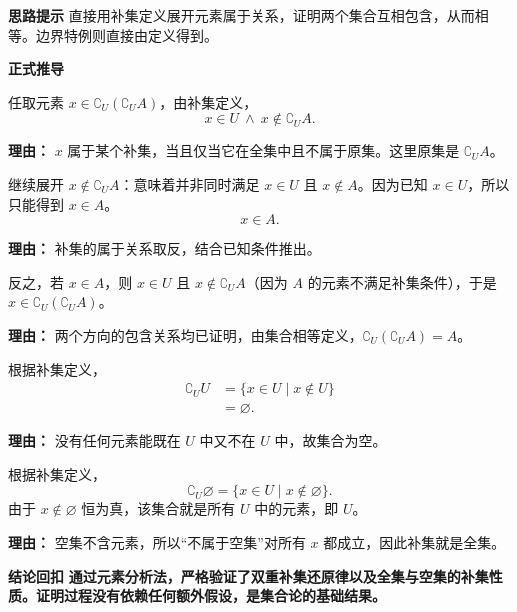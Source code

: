 \begin{proofbox}
	\textbf{\textcolor{CProof}{思路提示}}
	直接用补集定义展开元素属于关系，证明两个集合互相包含，从而相等。边界特例则直接由定义得到。

	\medskip
	\textbf{\textcolor{CProof}{正式推导}}
	\begin{description}[style=nextline, leftmargin=2.8em, labelsep=0.5em, itemsep=0.55em]
		\item[\textbf{步骤一（双补相等）：}] 任取元素 $x\in\complement_U(\complement_U A)$，由补集定义，
			\[
				x\in U\ \land\ x\notin\complement_U A.
			\]
			\par\textbf{理由：}
			$x$ 属于某个补集，当且仅当它在全集中且不属于原集。这里原集是 $\complement_U A$。

			继续展开 $x\notin\complement_U A$：意味着并非同时满足 $x\in U$ 且 $x\notin A$。因为已知 $x\in U$，所以只能得到 $x\in A$。
			\[
				x\in A.
			\]
			\par\textbf{理由：}
			补集的属于关系取反，结合已知条件推出。

			反之，若 $x\in A$，则 $x\in U$ 且 $x\notin\complement_U A$（因为 $A$ 的元素不满足补集条件），于是 $x\in\complement_U(\complement_U A)$。
			\par\textbf{理由：}
			两个方向的包含关系均已证明，由集合相等定义，$\complement_U(\complement_U A)=A$。

		\item[\textbf{步骤二（全集补空）：}] 根据补集定义，
			\[
				\begin{aligned}
					\complement_U U &= \{x\in U \mid x\notin U\} \\
					&= \varnothing.
			\end{aligned}
			\]
			\par\textbf{理由：}
			没有任何元素能既在 $U$ 中又不在 $U$ 中，故集合为空。

		\item[\textbf{步骤三（空集补全）：}] 根据补集定义，
			\[
				\complement_U \varnothing = \{x\in U \mid x\notin \varnothing\}.
			\]
			由于 $x\notin \varnothing$ 恒为真，该集合就是所有 $U$ 中的元素，即 $U$。
			\par\textbf{理由：}
			空集不含元素，所以“不属于空集”对所有 $x$ 都成立，因此补集就是全集。
	\end{description}

	\medskip
	\textbf{\textcolor{CProof}{结论回扣}}
	\textbf{通过元素分析法，严格验证了双重补集还原律以及全集与空集的补集性质。证明过程没有依赖任何额外假设，是集合论的基础结果。}
\end{proofbox}
